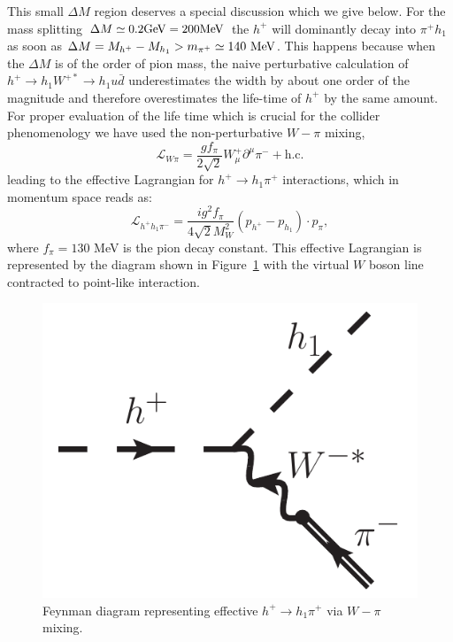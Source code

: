 \documentclass[12pt,a4paper]{article}
\begin{document}
{This small $\Delta M$ region deserves a special discussion which we give below.
For the mass splitting $\Delta M\simeq 0.2  {\rm GeV} = 200 {\rm MeV}$ the $h^+$ will dominantly decay into $\pi^+ h_1$
as soon as $\Delta M = M_{h^+}-M_{h_1} > m_{\pi^+} \simeq 140~{\rm MeV}$. This happens because when the $\Delta M$ is of the order of pion mass, the naive perturbative calculation of $h^+ \to h_1 W^{+*} \to  h_1 u\bar{d}$ underestimates the 
width by about one order of the magnitude and therefore overestimates
 the life-time of $h^+$ by the same amount. 
For proper evaluation of the life time which is crucial for the collider phenomenology we have used the non-perturbative 
$W-\pi$ mixing, 
\begin{equation}
  \mathcal{L}_{W\pi}  = \frac{g f_{\pi}}{2\sqrt{2}}W_{\mu}^{+}\partial^{\mu}\pi^{-} + 
\mathrm{h.c.}
\label{eq:wpi}
  \end{equation}
leading to the effective Lagrangian for $h^+ \to  h_1 \pi^+$ interactions,
which in momentum space reads as:
  \begin{equation}
\mathcal{L}_{h^+h_1\pi^-}  =  
\frac{i g^2 f_{\pi}}{4\sqrt{2}M_W^2} 
(p_{h^+}-p_{h_1})\cdot p_{\pi},
\label{EFT-pion}
\end{equation}
where  $f_{\pi}=130$ MeV is the  pion decay constant. This effective Lagrangian is represented by the  diagram  shown in Figure~\ref{fig:decay} with the virtual $W$ boson line contracted to point-like interaction.
\begin{figure}[htb]
  \centering
  \includegraphics[scale=0.5]{h+h1-pion.pdf}
  \caption{Feynman diagram representing effective 
  $h^+ \to  h_1 \pi^+$ via $W-\pi$ mixing.
  }
  \label{fig:decay}
\end{figure}

}
\end{document}
